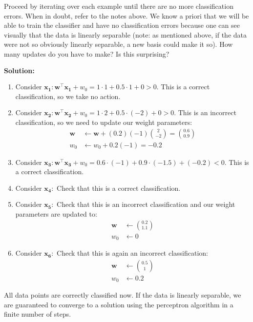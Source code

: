 \documentclass[12pt,letterpaper]{article}
\begin{document}
\begin{enumerate}
{{Proceed by iterating over each example until there are no more classification errors. When in doubt, refer to the notes above.
We know a priori that we will be able to train the classifier and have no classification errors because one can see visually
that the data is linearly separable (note: as mentioned above, if the data were not so obviously linearly separable, a new basis
could make it so). How many updates do you have to make? Is this surprising?

}}


\newpage

\textbf{Solution:}

\begin{enumerate}
\item Consider $\mathbf{x_1}: \mathbf{w}^\top \mathbf{x_1} + w_0 = 1\cdot 1 + 0.5\cdot 1 + 0 > 0$. 
This is a correct classification, so we take no action.
\item Consider $\mathbf{x_2}: 
\mathbf{w}^\top \mathbf{x_2} + w_0 = 1\cdot 2 + 0.5 \cdot (-2) + 0 > 0$. 
This is an incorrect classification, so we need to update our weight parameters:
\begin{align*}
\mathbf{w} &\leftarrow \mathbf{w} + (0.2)(-1)\binom{2}{-2} = \binom{0.6}{0.9}\\
w_0 &\leftarrow w_0 + 0.2(-1) = -0.2
\end{align*}
\item Consider $\mathbf{x_3}: 
\mathbf{w}^\top \mathbf{x_3} + w_0 = 0.6 \cdot (-1) + 0.9 \cdot (-1.5) + (-0.2) < 0$. This is a correct classification.
\item Consider $\mathbf{x_4}:$ Check that this is a correct classification.
\item Consider $\mathbf{x_5}:$ Check that this is an incorrect classification 
and our weight parameters are updated to:
\begin{align*}
\mathbf{w} &\leftarrow \binom{0.2}{1.1}\\
w_0 &\leftarrow 0
\end{align*}
\item Consider $\mathbf{x_6}:$ Check that this is again an incorrect classification:
\begin{align*}
\mathbf{w} &\leftarrow \binom{0.5}{1}\\
w_0 &\leftarrow 0.2
\end{align*}
\end{enumerate}

\noindent All data points are correctly classified now. If the data is linearly separable, we are guaranteed to converge to a solution using the perceptron algorithm in a finite number of steps.


\end{enumerate}
\end{document}

